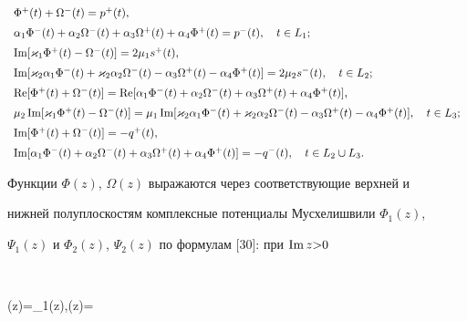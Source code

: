 \begin{equation} 


\begin{array}{l} 


\Phi^+(t)+\Omega^-(t)=p^+(t),\\[2mm] 


\alpha_1\Phi^-(t)+\alpha_2\Omega^-(t)+\alpha_3\Omega^+(t)+ 


\alpha_4\Phi^+(t)=p^-(t),\quad t\in L_1;\\[2mm] 


\im[\varkappa_1\Phi^+(t)-\Omega^-(t)]=2\mu_1s^+(t),\\[2mm] 


\im[\varkappa_2\alpha_1\Phi^-(t)+\varkappa_2\alpha_2\Omega^-(t)- 


\alpha_3\Omega^+(t)-\alpha_4\Phi^+(t)]=2\mu_2s^-(t),\quad 


t\in L_2;\\[2mm] 


\re[\Phi^+(t)+\Omega^-(t)]=\re[\alpha_1\Phi^-(t)+\alpha_2\Omega^-(t)+ 


\alpha_3\Omega^+(t)+\alpha_4\Phi^+(t)],\\[2mm] 


\mu_2\im[\varkappa_1\Phi^+(t)-\Omega^-(t)]=\mu_1\im 


[\varkappa_2\alpha_1\Phi^-(t)+\varkappa_2\alpha_2\Omega^-(t)- 


\alpha_3\Omega^+(t)-\alpha_4\Phi^+(t)],\quad t\in L_3;\\[2mm] 


\im[\Phi^+(t)+\Omega^-(t)]=-q^+(t),\\[2mm] 


\im[\alpha_1\Phi^-(t)+\alpha_2\Omega^-(t)+\alpha_3\Omega^+(t)+ 


\alpha_4\Phi^+(t)]=-q^-(t),\quad t\in L_2\cup L_3. 


\end{array} 


\end{equation} 


 


Функции $\Phi(z)$, $\Omega(z)$ выражаются через соответствующие верхней и 


нижней полуплоскостям комплексные потенциалы Мусхелишвили $\Phi_1(z)$, 


$\Psi_1(z)$ и $\Phi_2(z)$, $\Psi_2(z)$ по формулам [30]: при $\operatorname{Im} z{>}0$ 


$$ 


\Phi(z)=\Phi_1(z),\quad \Omega(z)= 


